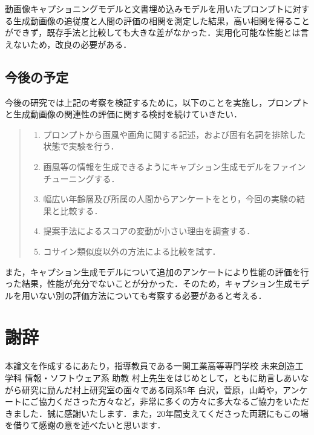 \documentclass[11pt,a4j]{jreport}
\begin{document}
動画像キャプショニングモデルと文書埋め込みモデルを用いたプロンプトに対する生成動画像の追従度と人間の評価の相関を測定した結果，高い相関を得ることができず，既存手法と比較しても大きな差がなかった．実用化可能な性能とは言えないため，改良の必要がある．

\section{今後の予定}
今後の研究では上記の考察を検証するために，以下のことを実施し，プロンプトと生成動画像の関連性の評価に関する検討を続けていきたい．

\begin{quote}\begin{enumerate}
    \item プロンプトから画風や画角に関する記述，および固有名詞を排除した状態で実験を行う．
    \item 画風等の情報を生成できるようにキャプション生成モデルをファインチューニングする．
    \item 幅広い年齢層及び所属の人間からアンケートをとり，今回の実験の結果と比較する．
    \item 提案手法によるスコアの変動が小さい理由を調査する．
    \item コサイン類似度以外の方法による比較を試す．
\end{enumerate}\end{quote}

また，キャプション生成モデルについて追加のアンケートにより性能の評価を行った結果，性能が充分でないことが分かった．そのため，キャプション生成モデルを用いない別の評価方法についても考察する必要があると考える．

\chapter*{謝辞}

本論文を作成するにあたり，指導教員である一関工業高等専門学校 未来創造工学科 情報・ソフトウェア系 助教 村上先生をはじめとして，ともに助言しあいながら研究に励んだ村上研究室の面々である同系5年 白沢，菅原，山崎や，アンケートにご協力くださった方々など，非常に多くの方々に多大なるご協力をいただきました．誠に感謝いたします．また，20年間支えてくださった両親にもこの場を借りて感謝の意を述べたいと思います．

\renewcommand{\bibname}{参考文献}


\end{document}
